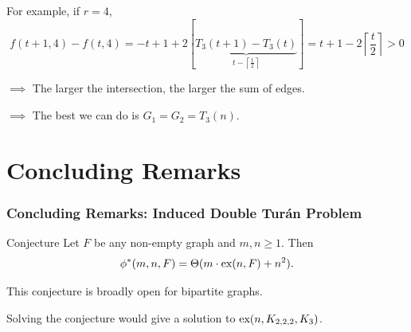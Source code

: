 \documentclass{beamer}
\newcommand*{\ex}{\textnormal{ex}}
\begin{document}
\begin{frame}
  \vspace{0.5cm}

  For example, if $r = 4$,
  \[
    f(t + 1, 4) - f(t, 4) = -t + 1 + 2[\underbrace{T_3(t + 1) - T_3(t)}_{t - \left\lceil\frac{t}{2}\right\rceil}] = t + 1 - 2\left\lceil\frac{t}{2}\right\rceil > 0
  \]

  \pause

  $\implies$ The larger the intersection, the larger the sum of edges.

  \pause

  \vspace{0.3cm}

  $\implies$ The best we can do is $G_1 = G_2 = T_3(n)$.
\end{frame}

\section{Concluding Remarks}

\begin{frame}
  \frametitle{Concluding Remarks: Induced Double Turán Problem}

  \begin{block}{Conjecture}
    Let $F$ be any non-empty graph and $m, n \geq 1$. Then
    \[ 
      \phi^*(m,n,F) = \Theta(m \cdot \ex(n,F) + n^2).
    \]
  \end{block}

  \pause

  \vspace{0.3cm}

  This conjecture is broadly open for bipartite graphs.

  \vspace{0.2cm}

  \begin{center}


  \end{center}

  \pause

  Solving the conjecture would give a solution to $\ex(n, K_{2,2,2}, K_3)$.
\end{frame}
\end{document}
